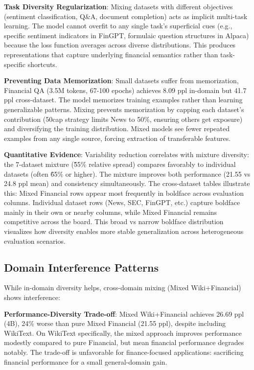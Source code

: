 \textbf{Task Diversity Regularization}: Mixing datasets with different objectives (sentiment classification, Q\&A, document completion) acts as implicit multi-task learning. The model cannot overfit to any single task's superficial cues (e.g., specific sentiment indicators in FinGPT, formulaic question structures in Alpaca) because the loss function averages across diverse distributions. This produces representations that capture underlying financial semantics rather than task-specific shortcuts.

\textbf{Preventing Data Memorization}: Small datasets suffer from memorization, Financial QA (3.5M tokens, 67-100 epochs) achieves 8.09 ppl in-domain but 41.7 ppl cross-dataset. The model memorizes training examples rather than learning generalizable patterns. Mixing prevents memorization by capping each dataset's contribution (50cap strategy limits News to 50\%, ensuring others get exposure) and diversifying the training distribution. Mixed models see fewer repeated examples from any single source, forcing extraction of transferable features.

\textbf{Quantitative Evidence}: Variability reduction correlates with mixture diversity: the 7-dataset mixture (\~55\% relative spread) compares favorably to individual datasets (often \~65\% or higher). The mixture improves both performance (21.55 vs 24.8 ppl mean) and consistency simultaneously. The cross-dataset tables illustrate this: Mixed Financial rows appear most frequently in boldface across evaluation columns. Individual dataset rows (News, SEC, FinGPT, etc.) capture boldface mainly in their own or nearby columns, while Mixed Financial remains competitive across the board. This broad vs narrow boldface distribution visualizes how diversity enables more stable generalization across heterogeneous evaluation scenarios.

\subsection{Domain Interference Patterns}

While in-domain diversity helps, cross-domain mixing (Mixed Wiki+Financial) shows interference:

\textbf{Performance-Diversity Trade-off}: Mixed Wiki+Financial achieves 26.69 ppl (4B), 24\% worse than pure Mixed Financial (21.55 ppl), despite including WikiText. On WikiText specifically, the mixed approach improves performance modestly compared to pure Financial, but mean financial performance degrades notably. The trade-off is unfavorable for finance-focused applications: sacrificing financial performance for a small general-domain gain.

